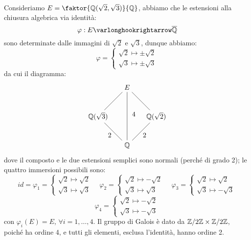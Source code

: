 \documentclass[11pt]{scrartcl}
\begin{document}
\begin{example}
    Consideriamo $E = \faktor{\QQ(\sqrt{2},\sqrt{3})}{\QQ}$, abbiamo che le estensioni alla chiusura algebrica via identità:
    \[ \varphi : E \varlonghookrightarrow \ol\QQ
        \]
    sono determinate dalle immagini di $\sqrt{2}$ e $\sqrt{3}$, dunque abbiamo:
    \[ \varphi = \begin{cases}
        \sqrt{2} \longmapsto \pm \sqrt{2} \\
        \sqrt{3} \longmapsto \pm \sqrt{3}
    \end{cases}
        \]
    da cui il diagramma:
    \[      \begin{tikzpicture}
		    \node (Q1) at (0,0) {$\QQ$};
		    \node (Q2) at (1.5,1.5) {$\QQ(\sqrt{2})$};
		    \node (Q3) at (0,3) {$E$};
		    \node (Q4) at (-1.5,1.5) {$\QQ(\sqrt{3})$};
		    \draw (Q1)--(Q2) node [pos=0.7, below,inner sep=0.25cm] {2};
		    \draw (Q1)--(Q4) node [pos=0.7, below,inner sep=0.25cm] {2};
		    \draw (Q3)--(Q4) node [pos=0.7, above] {};
		    \draw (Q2)--(Q3) node [pos=0.3, above] {};
		    \draw (Q1)--(Q3) node [pos=0.7, below, right,inner sep=0.25cm, yshift=-0.4cm] {$4$};
		    \end{tikzpicture}
        \]
    dove il composto e le due estensioni semplici sono normali (perché di grado 2); le quattro immersioni possibili sono:
    \[ id = \varphi_1 = \begin{cases}
        \sqrt{2} \longmapsto  \sqrt{2} \\
        \sqrt{3} \longmapsto  \sqrt{3}
    \end{cases}
    \quad
    \varphi_2 = \begin{cases}
        \sqrt{2} \longmapsto -\sqrt{2} \\
        \sqrt{3} \longmapsto  \sqrt{3}
    \end{cases}
    \quad
    \varphi_3 = \begin{cases}
        \sqrt{2} \longmapsto  \sqrt{2} \\
        \sqrt{3} \longmapsto  -\sqrt{3}
    \end{cases}
    \]\[
    \varphi_4 = \begin{cases}
        \sqrt{2} \longmapsto -\sqrt{2} \\
        \sqrt{3} \longmapsto -\sqrt{3}
    \end{cases}
        \]
    con $\varphi_i(E) = E$, $\forall i = 1,\ldots,4$. Il gruppo di Galois è dato da $\mathbb{Z}/{2}\mathbb{Z}\times\mathbb{Z}/{2}\mathbb{Z}$, poiché ha ordine 4, e tutti gli elementi, esclusa l'identità, hanno ordine 2. \\

\end{example}
\end{document}
